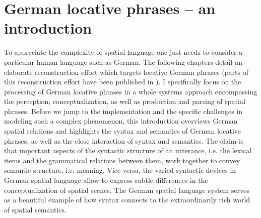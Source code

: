 
%

\chapter{German locative phrases -- an introduction}
\label{s:german-spatial-language-introduction}

To appreciate the complexity of spatial language one just needs
to consider a particular human language such as German.
The following chapters detail an elaborate reconstruction 
effort which targets locative German phrases (parts of this reconstruction
effort have been published in \citealt{spranger2011german}). 
I specifically focus on the processing of German locative phrases 
in a whole systems approach encompassing the perception, conceptualization,
as well as production and parsing of spatial phrases.
Before we jump to the implementation and the specific
challenges in modeling such a complex phenomenon, this introduction
overviews German spatial relations and highlights the syntax and 
semantics of German locative phrases, as well as the
close interaction of syntax and semantics. 
The claim is that important aspects of the syntactic structure of an utterance, i.e. 
the lexical items and the grammatical relations between them, work together to convey 
semantic structure, i.e. meaning. Vice versa, the varied syntactic 
devices in German spatial language allow to express subtle differences
in the conceptualization of spatial scenes. The German spatial language system serves 
as a beautiful example of how syntax connects to the extraordinarily rich world of 
spatial semantics. %


